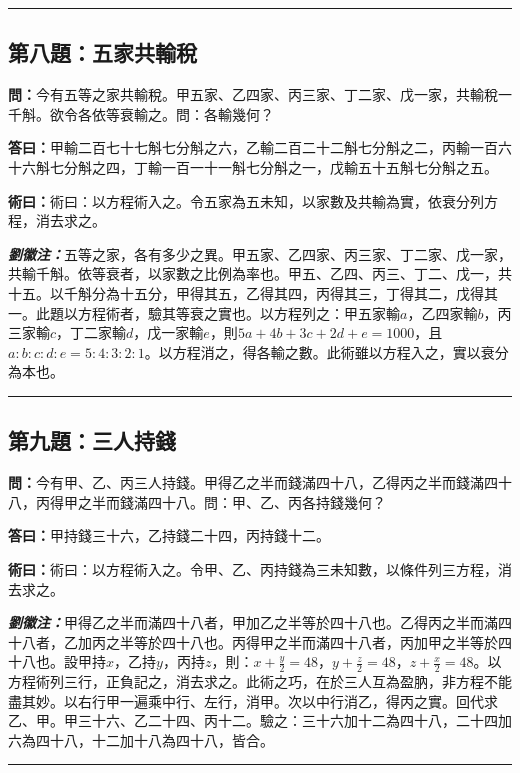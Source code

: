 \documentclass[11pt,a4paper]{article}
\newcommand{\wen}[1]{\textbf{\color{problemcolor}問：}#1\par}
\newcommand{\da}[1]{\textbf{答曰：}#1\par}
\newcommand{\shu}[1]{\textbf{術曰：}#1\par}
\newcommand{\liuhui}[1]{{\color{commentarycolor}\textit{\textbf{劉徽注：}}#1\par}}
\begin{document}
\bigskip
\hrule
\bigskip

\subsection{第八題：五家共輸稅}

\wen{今有五等之家共輸稅。甲五家、乙四家、丙三家、丁二家、戊一家，共輸稅一千斛。欲令各依等衰輸之。問：各輸幾何？}

\da{甲輸二百七十七斛七分斛之六，乙輸二百二十二斛七分斛之二，丙輸一百六十六斛七分斛之四，丁輸一百一十一斛七分斛之一，戊輸五十五斛七分斛之五。}

\shu{術曰：以方程術入之。令五家為五未知，以家數及共輸為實，依衰分列方程，消去求之。}

\liuhui{五等之家，各有多少之異。甲五家、乙四家、丙三家、丁二家、戊一家，共輸千斛。依等衰者，以家數之比例為率也。甲五、乙四、丙三、丁二、戊一，共十五。以千斛分為十五分，甲得其五，乙得其四，丙得其三，丁得其二，戊得其一。此題以方程術者，驗其等衰之實也。以方程列之：甲五家輸$a$，乙四家輸$b$，丙三家輸$c$，丁二家輸$d$，戊一家輸$e$，則$5a + 4b + 3c + 2d + e = 1000$，且$a:b:c:d:e = 5:4:3:2:1$。以方程消之，得各輸之數。此術雖以方程入之，實以衰分為本也。}

\bigskip
\hrule
\bigskip

\subsection{第九題：三人持錢}

\wen{今有甲、乙、丙三人持錢。甲得乙之半而錢滿四十八，乙得丙之半而錢滿四十八，丙得甲之半而錢滿四十八。問：甲、乙、丙各持錢幾何？}

\da{甲持錢三十六，乙持錢二十四，丙持錢十二。}

\shu{術曰：以方程術入之。令甲、乙、丙持錢為三未知數，以條件列三方程，消去求之。}

\liuhui{甲得乙之半而滿四十八者，甲加乙之半等於四十八也。乙得丙之半而滿四十八者，乙加丙之半等於四十八也。丙得甲之半而滿四十八者，丙加甲之半等於四十八也。設甲持$x$，乙持$y$，丙持$z$，則：$x + \frac{y}{2} = 48$，$y + \frac{z}{2} = 48$，$z + \frac{x}{2} = 48$。以方程術列三行，正負記之，消去求之。此術之巧，在於三人互為盈肭，非方程不能盡其妙。以右行甲一遍乘中行、左行，消甲。次以中行消乙，得丙之實。回代求乙、甲。甲三十六、乙二十四、丙十二。驗之：三十六加十二為四十八，二十四加六為四十八，十二加十八為四十八，皆合。}

\bigskip
\hrule
\bigskip

\end{document}
